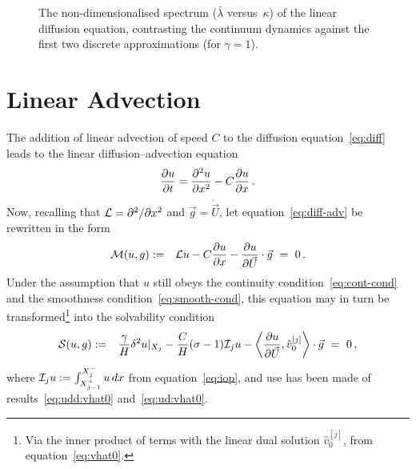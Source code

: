 \documentclass[12pt,a5paper]{article}
\begin{document}
\begin{figure}[hbt]
\centering
{}
\caption{The  non-dimensionalised spectrum ($\bar{\lambda}$ versus~$\kappa$) of the linear diffusion equation, contrasting the 
continuum dynamics against the first two discrete approximations (for $\gamma=1$).}
\label{fig:spec:2nd-order:nd}
\end{figure}

\section{Linear Advection}
The addition of linear advection of speed $C$ to the diffusion equation~\eqref{eq:diff} leads to the
linear diffusion--advection equation
\begin{eqnarray}
	\D tu = \DD xu - C\D xu\,.
	\label{eq:diff-adv}
\end{eqnarray}
Now, recalling that ${\cal L}=\DD{x}{}$ and $\vec{g}=\dot{\vec{U}}$, let equation~\eqref{eq:diff-adv} be rewritten in the form
\begin{eqnarray}
{\cal M}(u,g) & := & {\cal L}u-C\D xu-\D{\vec{U}}{u}\cdot\vec{g}~=~0\,.
\label{eq:Mug}
\end{eqnarray}
Under the assumption that $u$ still obeys the continuity condition~\eqref{eq:cont-cond} and the smoothness condition~\eqref{eq:smooth-cond}, this equation may in turn be transformed\footnote{Via the inner product of terms with the
linear dual solution $\hat{v}_0^{[j]}$, from equation~\eqref{eq:vhat0}.} into the solvability condition
\begin{eqnarray}
       {\cal S}(u,g) & := & 
          \frac{\gamma}{H}\delta^2u|_{X_j} - \frac{C}{H}(\sigma-1){\cal I}_j u
	-\left\langle\D {\vec U}u,\hat{v}_0^{[j]}\right\rangle\cdot\vec{g}~=~0 \,,
\label{eq:Sug}
\end{eqnarray}
where ${\cal I}_j u := \int_{X^+_{j-1}}^{X^-_j}u\,dx$
from equation~\eqref{eq:iop}, and
use has been made of results~\eqref{eq:udd:vhat0} and~\eqref{eq:ud:vhat0}.
\end{document}
